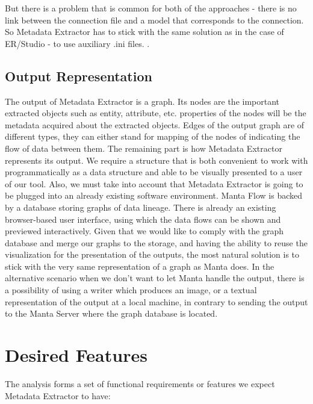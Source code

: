 But there is a problem that is common for both of the approaches -  there is no link between the connection file and a model that corresponds to the connection. 
So Metadata Extractor has to stick with the same solution as in the case of ER/Studio - to use auxiliary .ini files. .

\subsection{Output Representation}

The output of Metadata Extractor is a graph. Its nodes are the important extracted objects such as entity, attribute, etc. properties of the nodes will be the metadata acquired about the extracted objects. Edges of the output graph are of different types, they can either stand for mapping of the nodes of indicating the flow of data between them. 
The remaining part is how Metadata Extractor represents its output. We require a structure that is both convenient to work with programmatically as a data structure and able to be visually presented to a user of our tool.
Also, we must take into account that Metadata Extractor is going to be plugged into an already existing software environment. 
Manta Flow is backed by a database storing graphs of data lineage. There is already an existing browser-based user interface, using which the data flows can be shown and previewed interactively. 
Given that we would like to comply with the graph database and merge our graphs to the storage, and having the ability to reuse the visualization for the presentation of the outputs, the most natural solution is to stick with the very same representation of a graph as Manta does.
In the alternative scenario when we don't want to let Manta handle the output, there is a possibility of using a writer which produces an image, or a textual representation of the output at a local machine, in contrary to sending the output to the Manta Server where the graph database is located.

\section{Desired Features}

The analysis forms a set of functional requirements or features we expect Metadata Extractor to have:

